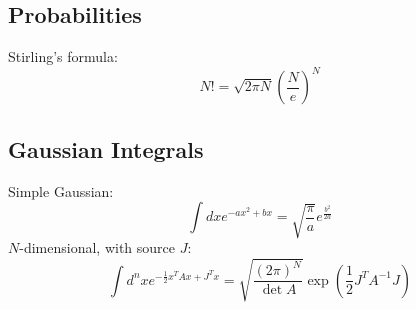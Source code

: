 \documentclass[twocolumn]{article}
\begin{document}
\subsection{Probabilities}
Stirling's formula:
\begin{equation}
    N! = \sqrt{2\pi N}\left(\frac{N}{e}\right)^N
\end{equation}
\subsection{Gaussian Integrals}
Simple Gaussian:
\begin{equation}
    \int dx  e^{-ax^2 + bx} = \sqrt{\frac{\pi}{a}}e^{\frac{b^2}{2a}}
\end{equation}
$N$-dimensional, with source $J$:
\begin{equation}
    \int d^n x  e^{-\frac{1}{2} x^T A x + J^T x} = \sqrt{\frac{(2\pi)^N}{\det A}} \exp\left( \frac{1}{2} J^T A^{-1} J \right)
\end{equation}
\end{document}
